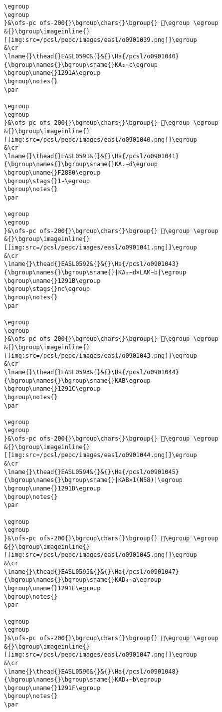 \begin{verbatim}
\egroup
\egroup
}&\ofs-pc ofs-200{}\bgroup\chars{}\bgroup{} 𒤙\egroup \egroup
&{}\bgroup\imageinline{}[[img:src=/pcsl/pepc/images/easl/o0901039.png]]\egroup
&\cr
\lname{}\thead{}EASL0590&{}&{}\Ha{/pcsl/o0901040}{\bgroup\names{}\bgroup\sname{}KA₂∼c\egroup
\bgroup\uname{}1291A\egroup
\bgroup\notes{}
\par 

\egroup
\egroup
}&\ofs-pc ofs-200{}\bgroup\chars{}\bgroup{} 𒤚\egroup \egroup
&{}\bgroup\imageinline{}[[img:src=/pcsl/pepc/images/easl/o0901040.png]]\egroup
&\cr
\lname{}\thead{}EASL0591&{}&{}\Ha{/pcsl/o0901041}{\bgroup\names{}\bgroup\sname{}KA₂∼d\egroup
\bgroup\uname{}F2880\egroup
\bgroup\stags{}1-\egroup
\bgroup\notes{}
\par 

\egroup
\egroup
}&\ofs-pc ofs-200{}\bgroup\chars{}\bgroup{} 󲢀\egroup \egroup
&{}\bgroup\imageinline{}[[img:src=/pcsl/pepc/images/easl/o0901041.png]]\egroup
&\cr
\lname{}\thead{}EASL0592&{}&{}\Ha{/pcsl/o0901043}{\bgroup\names{}\bgroup\sname{}|KA₂∼d×LAM∼b|\egroup
\bgroup\uname{}1291B\egroup
\bgroup\stags{}nc\egroup
\bgroup\notes{}
\par 

\egroup
\egroup
}&\ofs-pc ofs-200{}\bgroup\chars{}\bgroup{} 𒤛\egroup \egroup
&{}\bgroup\imageinline{}[[img:src=/pcsl/pepc/images/easl/o0901043.png]]\egroup
&\cr
\lname{}\thead{}EASL0593&{}&{}\Ha{/pcsl/o0901044}{\bgroup\names{}\bgroup\sname{}KAB\egroup
\bgroup\uname{}1291C\egroup
\bgroup\notes{}
\par 

\egroup
\egroup
}&\ofs-pc ofs-200{}\bgroup\chars{}\bgroup{} 𒤜\egroup \egroup
&{}\bgroup\imageinline{}[[img:src=/pcsl/pepc/images/easl/o0901044.png]]\egroup
&\cr
\lname{}\thead{}EASL0594&{}&{}\Ha{/pcsl/o0901045}{\bgroup\names{}\bgroup\sname{}|KAB×1(N58)|\egroup
\bgroup\uname{}1291D\egroup
\bgroup\notes{}
\par 

\egroup
\egroup
}&\ofs-pc ofs-200{}\bgroup\chars{}\bgroup{} 𒤝\egroup \egroup
&{}\bgroup\imageinline{}[[img:src=/pcsl/pepc/images/easl/o0901045.png]]\egroup
&\cr
\lname{}\thead{}EASL0595&{}&{}\Ha{/pcsl/o0901047}{\bgroup\names{}\bgroup\sname{}KAD₄∼a\egroup
\bgroup\uname{}1291E\egroup
\bgroup\notes{}
\par 

\egroup
\egroup
}&\ofs-pc ofs-200{}\bgroup\chars{}\bgroup{} 𒤞\egroup \egroup
&{}\bgroup\imageinline{}[[img:src=/pcsl/pepc/images/easl/o0901047.png]]\egroup
&\cr
\lname{}\thead{}EASL0596&{}&{}\Ha{/pcsl/o0901048}{\bgroup\names{}\bgroup\sname{}KAD₄∼b\egroup
\bgroup\uname{}1291F\egroup
\bgroup\notes{}
\par 


\end{verbatim}
